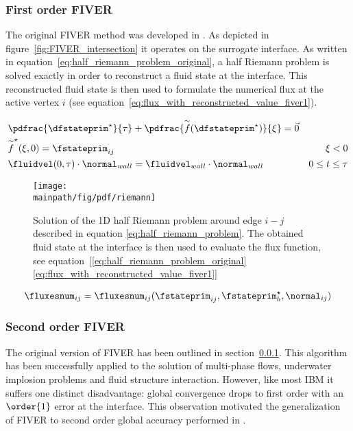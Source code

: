 \documentclass[../main.tex]{subfiles}
\begin{document}
\subsubsection{First order \ac{FIVER}}\label{sec:fiver-1}
The original \ac{FIVER} method was developed in \cite{Farhat2008}. As depicted in figure~\ref{fig:FIVER_intersection} it operates on the surrogate interface. As written in equation~\eqref{eq:half_riemann_problem_original}, a half Riemann problem is solved exactly in order to reconstruct a fluid state at the interface. This reconstructed fluid state is then used to formulate the numerical flux at the active vertex $i$ (see equation~\eqref{eq:flux_with_reconstructed_value_fiver1}).


\begin{align}\label{eq:half_riemann_problem_original}
&\pdfrac{\dfstateprim^{\star}}{\tau} + \pdfrac{\overset{\sim}{f}(\dfstateprim^{\star})}{\xi} = \vec{0} & \nonumber\\
&\overset{\sim}{f}^{\star}(\xi,0)=\fstateprim_{ij}                                                     & \xi<0 \nonumber\\
&\fluidvel(0,\tau)\cdot \normal_{wall} = \fluidvel_{wall}\cdot\normal_{wall}                          & 0\leq t \leq \tau
\end{align}

\begin{figure}[h!]
	\begin{center}
        \texttt{[image: \\mainpath/fig/pdf/riemann]}
        \caption[Riemann Sketch]{Solution of the 1D half Riemann problem around edge $i-j$ described in equation \eqref{eq:half_riemann_problem}. The obtained fluid state at the interface is then used to evaluate the flux function, see equation~[\eqref{eq:half_riemann_problem_original}\eqref{eq:flux_with_reconstructed_value_fiver1}]}
		\label{fig:riemann_sketch}
    \end{center}
\end{figure}

\begin{align}\label{eq:flux_with_reconstructed_value_fiver1}
\fluxesnum_{ij}=\fluxesnum_{ij}(\fstateprim_{ij},\fstateprim^{\star}_b, \normal_{ij})
\end{align}



\subsubsection{Second order \ac{FIVER}}\label{sec:fiver-2}
The original version of \ac{FIVER} has been outlined in section~\ref{sec:fiver-1}. This algorithm has been successfully applied to the solution of multi-phase flows, underwater implosion problems and fluid structure interaction. However, like most \ac{IBM} it suffers one distinct disadvantage: global convergence drops to first order with an $\order{1}$ error at the interface. This observation motivated the generalization of FIVER to second order global accuracy performed in \cite{Main2014}.\\
\end{document}
